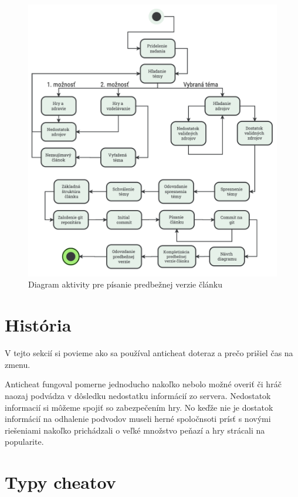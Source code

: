 \documentclass[10pt,twoside,slovak,a4paper]{article}
\begin{document}
\begin{figure}[h]
    \centering
    \includegraphics[width=1\textwidth]{diagram.png}
    \caption{Diagram aktivity pre písanie predbežnej verzie článku}
    \label{fig:mesh1}
\end{figure}

\section{História}

V tejto sekcií si povieme ako sa používal anticheat doteraz a prečo prišiel čas na zmenu. 

Anticheat fungoval pomerne jednoducho nakoľko nebolo možné overiť či hráč naozaj podvádza v dôsledku nedostatku informácií zo servera. Nedostatok informacií si môžeme spojiť so zabezpečením hry. No keďže nie je dostatok informácií na odhalenie podvodov museli herné spoločnsoti prísť s novými riešeniami nakoľko prichádzali o veľké množstvo peňazí a hry strácali na popularite.

\hypertarget{typy-cheatov}{%
\section{\texorpdfstring{Typy cheatov
}{Typy cheatov }}\label{typy-cheatov}}
\end{document}
